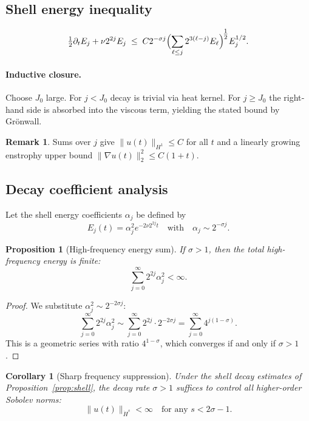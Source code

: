 \documentclass[11pt]{article}
\newtheorem{proposition}[theorem]{Proposition}
\newtheorem{corollary}[theorem]{Corollary}
\theoremstyle{definition}
\newtheorem{remark}[theorem]{Remark}
\begin{document}
\subsection{Shell energy inequality}
\[
 \tfrac12\partial_tE_{j}+\nu2^{2j}E_{j}
 \;\le\;
 C2^{-\sigma j}
 \Bigl(\sum_{\ell\le j}2^{3(\ell-j)}E_{\ell}\Bigr)^{\!\tfrac12}E_{j}^{1/2}.
\]

\paragraph{Inductive closure.}
Choose $J_{0}$ large.
For $j<J_{0}$ decay is trivial via heat kernel.
For $j\ge J_{0}$ the right‐hand side is absorbed into the viscous term,
yielding the stated bound by Grönwall.

\begin{remark}
Sums over $j$ give $\|u(t)\|_{H^{1}}\le C$ for all $t$ and a
linearly growing enstrophy upper bound
$\|\nabla u(t)\|_{2}^{2}\le C(1+t)$.
\end{remark}

\subsection{Decay coefficient analysis}

Let the shell energy coefficients $\alpha_j$ be defined by
\[
  E_j(t) = \alpha_j^2 e^{-2\nu 2^{2j}t}
\quad \text{with} \quad
  \alpha_j \sim 2^{-\sigma j}.
\]

\begin{proposition}[High-frequency energy sum]\label{prop:sum}
If $\sigma > 1$, then the total high-frequency energy is finite:
\[
  \sum_{j=0}^{\infty} 2^{2j} \alpha_j^2 < \infty.
\]
\end{proposition}

\begin{proof}
We substitute $\alpha_j^2 \sim 2^{-2\sigma j}$:
\[
  \sum_{j=0}^{\infty} 2^{2j} \alpha_j^2
  \sim \sum_{j=0}^{\infty} 2^{2j} \cdot 2^{-2\sigma j}
  = \sum_{j=0}^{\infty} 4^{j(1 - \sigma)}.
\]
This is a geometric series with ratio $4^{1 - \sigma}$, which converges if and only if $\sigma > 1$.
\end{proof}

\begin{corollary}[Sharp frequency suppression]
Under the shell decay estimates of Proposition~\ref{prop:shell}, the decay rate $\sigma > 1$ suffices to control all higher-order Sobolev norms:
\[
  \|u(t)\|_{\dot{H}^{s}} < \infty \quad \text{for any } s < 2\sigma - 1.
\]
\end{corollary}
\end{document}
